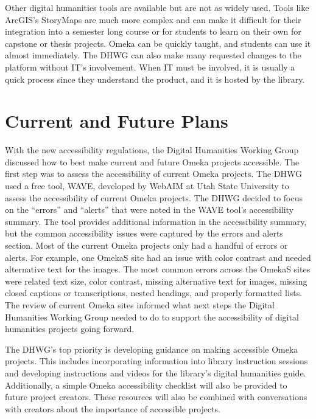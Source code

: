 \documentclass[final]{anthology-ch}
\begin{document}
Other digital humanities tools are available but are not as widely used. Tools like ArcGIS's StoryMaps are much more complex and can make it difficult for their integration into a semester long course or for students to learn on their own for capstone or thesis projects. Omeka can be quickly taught, and students can use it almost immediately. The DHWG can also make many requested changes to the platform without IT's involvement. When IT must be involved, it is usually a quick process since they understand the product, and it is hosted by the library.

\section{Current and Future Plans} \label{sec:plans}

With the new accessibility regulations, the Digital Humanities Working Group discussed how to best make current and future Omeka projects accessible. The first step was to assess the accessibility of current Omeka projects. The DHWG used a free tool, WAVE, developed by WebAIM at Utah State University \cite{webaimwave} to assess the accessibility of current Omeka projects. The DHWG decided to focus on the \enquote{errors} and \enquote{alerts} that were noted in the WAVE tool's accessibility summary. The tool provides additional information in the accessibility summary, but the common accessibility issues were captured by the errors and alerts section. Most of the current Omeka projects only had a handful of errors or alerts. For example, one OmekaS site had an issue with color contrast and needed alternative text for the images. The most common errors across the OmekaS sites were related text size, color contrast, missing alternative text for images, missing closed captions or transcriptions, nested headings, and properly formatted lists. The review of current Omeka sites informed what next steps the Digital Humanities Working Group needed to do to support the accessibility of digital humanities projects going forward.

The DHWG's top priority is developing guidance on making accessible Omeka projects. This includes incorporating information into library instruction sessions and developing instructions and videos for the library's digital humanities guide. Additionally, a simple Omeka accessibility checklist will also be provided to future project creators. These resources will also be combined with conversations with creators about the importance of accessible projects.
\end{document}
